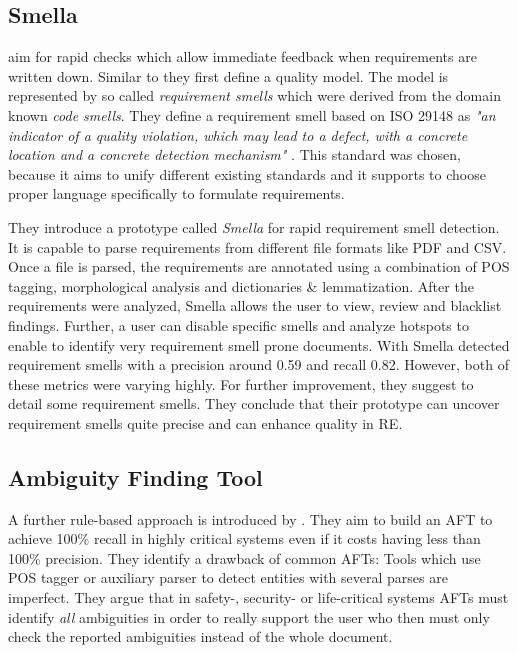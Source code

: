 \subsection{Smella}
\textcite{Femmer:2017} aim for rapid checks which allow immediate feedback when requirements are written down.
Similar to \textcite{Fabbrini:2002} they first define a quality model.
The model is represented by so called \textit{requirement smells} which were derived from the domain known \textit{code smells}.
They define a requirement smell based on ISO 29148 as \textit{"an indicator of a quality violation, which may lead to a defect, with a concrete location and a concrete detection mechanism"} \parencite{Femmer:2017}.
This standard was chosen, because it aims to unify different existing standards and it supports to choose proper language specifically to formulate requirements.

They introduce a prototype called \textit{Smella} for rapid requirement smell detection.
It is capable to parse requirements from different file formats like \ac{PDF} and \ac{CSV}.
Once a file is parsed, the requirements are annotated using a combination of \ac{POS} tagging, morphological analysis and dictionaries \& lemmatization.
After the requirements were analyzed, Smella allows the user to view, review and blacklist findings.
Further, a user can disable specific smells and analyze hotspots to enable to identify very requirement smell prone documents.
With Smella \textcite{Femmer:2017} detected requirement smells with a precision around 0.59 and recall 0.82.
However, both of these metrics were varying highly.
For further improvement, they suggest to detail some requirement smells.
They conclude that their prototype can uncover requirement smells quite precise and can enhance quality in \ac{RE}.

\subsection{Ambiguity Finding Tool}
A further rule-based approach is introduced by \textcite{Tjong:2013}.
They aim to build an \ac{AFT} to achieve 100\% recall in highly critical systems even if it costs having less than 100\% precision.
They identify a drawback of common \acp{AFT}:
Tools which use \ac{POS} tagger or auxiliary parser to detect entities with several parses are imperfect.
They argue that in safety-, security- or life-critical systems \acp{AFT} must identify \textit{all} ambiguities in order to really support the user who then must only check the reported ambiguities instead of the whole document.

